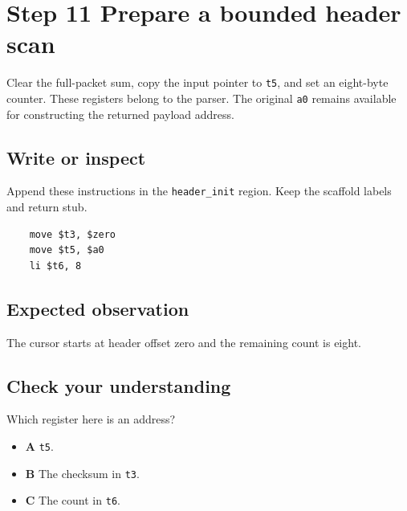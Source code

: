 \section{Step 11 Prepare a bounded header scan}\label{packet-s11}

Clear the full-packet sum, copy the input pointer to \texttt{t5}, and set an eight-byte counter. These registers belong to the parser. The original \texttt{a0} remains available for constructing the returned payload address.

\subsection{Write or inspect}
Append these instructions in the \texttt{header\_init} region. Keep the scaffold labels and return stub.

\begin{verbatim}
    move $t3, $zero
    move $t5, $a0
    li $t6, 8
\end{verbatim}

\subsection{Expected observation}
The cursor starts at header offset zero and the remaining count is eight.

\subsection{Check your understanding}
Which register here is an address?

\begin{itemize}
  \item \textbf{A} \texttt{t5}.
  \item \textbf{B} The checksum in \texttt{t3}.
  \item \textbf{C} The count in \texttt{t6}.
\end{itemize}

